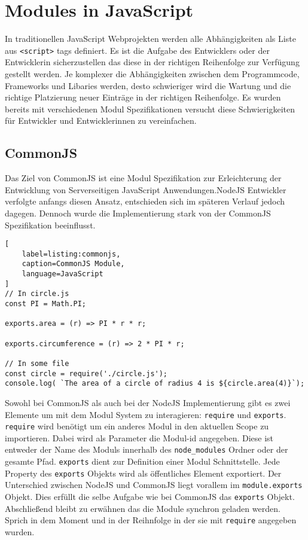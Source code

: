 \section{Modules in JavaScript}
\label{section:modules_in_javaScript}
In traditionellen JavaScript Webprojekten werden alle Abhängigkeiten als Liste aus \lstinline{<script>} tags definiert. Es ist die Aufgabe des Entwicklers oder der Entwicklerin sicherzustellen das diese in der richtigen Reihenfolge zur Verfügung gestellt werden. Je komplexer die Abhängigkeiten zwischen dem  Programmcode, Frameworks und Libaries werden, desto schwieriger wird die Wartung und die richtige Platzierung neuer Einträge in der richtigen Reihenfolge. Es wurden bereits mit verschiedenen Modul Spezifikationen versucht diese Schwierigkeiten für Entwickler und Entwicklerinnen zu vereinfachen. \autocite{SebastianPeyrott}

\subsection{CommonJS}
Das Ziel von CommonJS ist eine Modul Spezifikation zur Erleichterung der Entwicklung von Serverseitigen JavaScript Anwendungen.NodeJS Entwickler verfolgte anfangs diesen Ansatz, entschieden sich im späteren Verlauf jedoch dagegen. Dennoch wurde die Implementierung stark von der CommonJS Spezifikation beeinflusst. \autocite{SebastianPeyrott}

\begin{lstlisting}[
    label=listing:commonjs,
	caption=CommonJS Module,
	language=JavaScript
]
// In circle.js
const PI = Math.PI;

exports.area = (r) => PI * r * r;

exports.circumference = (r) => 2 * PI * r;

// In some file
const circle = require('./circle.js');
console.log( `The area of a circle of radius 4 is ${circle.area(4)}`);
\end{lstlisting}

Sowohl bei CommonJS als auch bei der NodeJS Implementierung gibt es zwei Elemente um mit dem Modul System zu interagieren: \lstinline{require} und \lstinline{exports}. \lstinline{require} wird benötigt um ein anderes Modul in den aktuellen Scope zu importieren. Dabei wird als Parameter die Modul-id angegeben. Diese ist entweder der Name des Moduls innerhalb des \lstinline{node_modules} Ordner oder der gesamte Pfad. \lstinline{exports} dient zur Definition einer Modul Schnittstelle. Jede Property des \lstinline{exports} Objekts wird als öffentliches Element exportiert. Der Unterschied zwischen NodeJS und CommonJS liegt vorallem im \lstinline{module.exports} Objekt. Dies erfüllt die selbe Aufgabe wie bei CommonJS das \lstinline{exports} Objekt. Abschließend bleibt zu erwähnen das die Module synchron geladen werden. Sprich in dem Moment und in der Reihnfolge in der sie mit \lstinline{require} angegeben wurden.\autocite{SebastianPeyrott}

